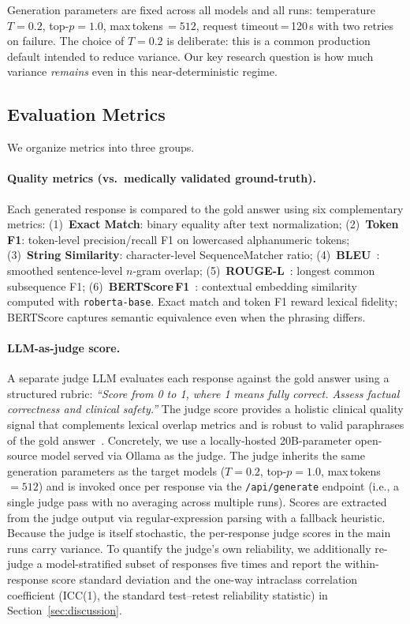 \documentclass[11pt]{article}
\begin{document}
Generation parameters are fixed across all models and all runs:
temperature $T{=}0.2$, top-$p{=}1.0$, max\,tokens\,$=512$,
request timeout\,=\,120\,s with two retries on failure.
The choice of $T{=}0.2$ is deliberate: this is a common production
default intended to reduce variance.
Our key research question is how much variance \emph{remains} even
in this near-deterministic regime.

\subsection{Evaluation Metrics}
\label{sec:metrics}

We organize metrics into three groups.

\paragraph{Quality metrics (vs.\ medically validated ground-truth).}
Each generated response is compared to the gold answer using six
complementary metrics:
(1)~\textbf{Exact Match}: binary equality after text normalization;
(2)~\textbf{Token F1}: token-level precision/recall F1 on
lowercased alphanumeric tokens;
(3)~\textbf{String Similarity}: character-level SequenceMatcher ratio;
(4)~\textbf{BLEU}~\cite{papineni2002bleu}: smoothed sentence-level
$n$-gram overlap;
(5)~\textbf{ROUGE-L}~\cite{lin2004rouge}: longest common subsequence F1;
(6)~\textbf{BERTScore\,F1}~\cite{zhang2020bertscore}: contextual
embedding similarity computed with \texttt{roberta-base}.
Exact match and token F1 reward lexical fidelity;
BERTScore captures semantic equivalence even when the phrasing differs.

\paragraph{LLM-as-judge score.}
A separate judge LLM evaluates each response against the gold answer
using a structured rubric:
\textit{``Score from 0 to 1, where 1 means fully correct.
Assess factual correctness and clinical safety.''}
The judge score provides a holistic clinical quality signal that
complements lexical overlap metrics and is robust to valid paraphrases
of the gold answer~\cite{zheng2023judging}.
Concretely, we use a locally-hosted 20B-parameter open-source model
served via Ollama as the judge.
The judge inherits the same generation parameters as the target models
($T{=}0.2$, top-$p{=}1.0$, max\,tokens\,$=512$) and is invoked once
per response via the \texttt{/api/generate} endpoint (i.e., a single
judge pass with no averaging across multiple runs).
Scores are extracted from the judge output via regular-expression
parsing with a fallback heuristic.
Because the judge is itself stochastic, the per-response judge scores in
the main runs carry variance. To quantify the judge's own reliability,
we additionally re-judge a model-stratified subset of responses five
times and report the within-response score standard deviation and the
one-way intraclass correlation coefficient (ICC(1), the standard
test--retest reliability statistic) in Section~\ref{sec:discussion}.
\end{document}
